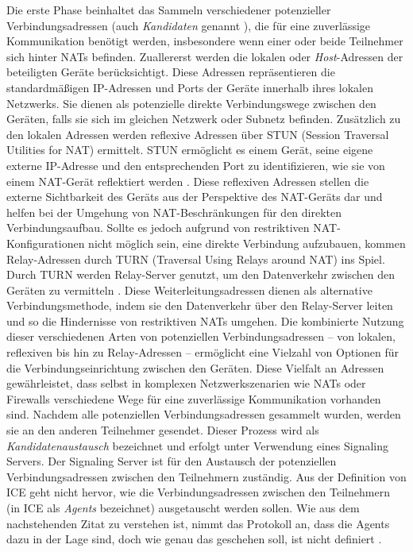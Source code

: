 Die erste Phase beinhaltet das Sammeln verschiedener potenzieller Verbindungsadressen (auch \textit{Kandidaten} genannt \parencite[S. 8]{rfc8445_ICE}), die für eine zuverlässige Kommunikation benötigt werden, insbesondere wenn einer oder beide Teilnehmer sich hinter NATs befinden. Zuallererst werden die lokalen oder \textit{Host}-Adressen der beteiligten Geräte berücksichtigt. Diese Adressen repräsentieren die standardmäßigen IP-Adressen und Ports der Geräte innerhalb ihres lokalen Netzwerks. Sie dienen als potenzielle direkte Verbindungswege zwischen den Geräten, falls sie sich im gleichen Netzwerk oder Subnetz befinden.
Zusätzlich zu den lokalen Adressen werden reflexive Adressen über STUN (Session Traversal Utilities for NAT) ermittelt. STUN ermöglicht es einem Gerät, seine eigene externe IP-Adresse und den entsprechenden Port zu identifizieren, wie sie von einem NAT-Gerät reflektiert werden \parencite[S. 4]{rfc8489_STUN}. Diese reflexiven Adressen stellen die externe Sichtbarkeit des Geräts aus der Perspektive des NAT-Geräts dar und helfen bei der Umgehung von NAT-Beschränkungen für den direkten Verbindungsaufbau. Sollte es jedoch aufgrund von restriktiven NAT-Konfigurationen nicht möglich sein, eine direkte Verbindung aufzubauen, kommen Relay-Adressen durch TURN (Traversal Using Relays around NAT) ins Spiel.
Durch TURN werden Relay-Server genutzt, um den Datenverkehr zwischen den Geräten zu vermitteln \parencite[S. 10 f.]{rfc8656_TURN}. Diese Weiterleitungsadressen dienen als alternative Verbindungsmethode, indem sie den Datenverkehr über den Relay-Server leiten und so die Hindernisse von restriktiven NATs umgehen.
Die kombinierte Nutzung dieser verschiedenen Arten von potenziellen Verbindungsadressen – von lokalen, reflexiven bis hin zu Relay-Adressen – ermöglicht eine Vielzahl von Optionen für die Verbindungseinrichtung zwischen den Geräten. Diese Vielfalt an Adressen gewährleistet, dass selbst in komplexen Netzwerkszenarien wie NATs oder Firewalls verschiedene Wege für eine zuverlässige Kommunikation vorhanden sind.
Nachdem alle potenziellen Verbindungsadressen gesammelt wurden, werden sie an den anderen Teilnehmer gesendet. Dieser Prozess wird als \textit{Kandidatenaustausch} bezeichnet und erfolgt unter Verwendung eines Signaling Servers. Der Signaling Server ist für den Austausch der potenziellen Verbindungsadressen zwischen den Teilnehmern zuständig. Aus der Definition von ICE geht nicht hervor, wie die Verbindungsadressen zwischen den Teilnehmern (in ICE als \textit{Agents} bezeichnet) ausgetauscht werden sollen. Wie aus dem nachstehenden Zitat zu verstehen ist, nimmt das Protokoll an, dass die Agents dazu in der Lage sind, doch wie genau das geschehen soll, ist nicht definiert \Parencite[S. 7 ff.]{rfc8445_ICE}.

